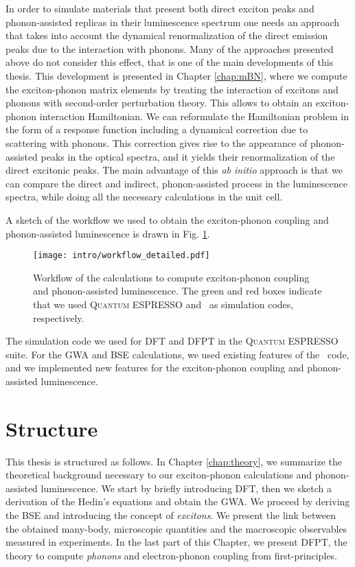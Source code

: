 In order to simulate materials that present both direct exciton
peaks and phonon-assisted replicas in their luminescence spectrum one needs an approach that takes into account the dynamical renormalization of the direct emission peaks due
to the interaction with phonons. Many of the approaches presented above do not consider this effect, that is one of the main developments of this thesis.
This development is presented in Chapter \ref{chap:mBN}, where we compute the exciton-phonon matrix elements by treating the interaction of excitons and phonons with second-order perturbation theory. This allows to obtain an exciton-phonon interaction Hamiltonian. We can reformulate the Hamiltonian problem in the form of a response function including a dynamical correction due to scattering with phonons. This correction gives rise to the appearance of phonon-assisted peaks in the optical spectra, and it yields their renormalization of the direct excitonic peaks. The main advantage of this \textit{ab initio} approach is that we can compare the direct and indirect, phonon-assisted process in the luminescence spectra, while doing all the necessary calculations in the unit cell.

A sketch of the workflow we used to obtain the exciton-phonon coupling and phonon-assisted luminescence is drawn in Fig. \ref{fig:workflow}.
\begin{figure}[H]
	\vspace{0.2cm}
	\setcapindent{2em}
	\centering
	\texttt{[image: intro/workflow\_detailed.pdf]}
	\caption{Workflow of the calculations to compute exciton-phonon coupling and phonon-assisted luminescence. The green and red boxes indicate that we used \textsc{Quantum ESPRESSO} and \yambo~as simulation codes, respectively.}
	\label{fig:workflow}
\end{figure}
The simulation code we used for \acrshort{DFT} and \acrshort{DFPT} in the \textsc{Quantum ESPRESSO} suite.\cite{giannozzi2009quantum,giannozzi2017advanced} For the \acrshort{GWA} and \acrshort{BSE} calculations, we used existing features of the \yambo~code,\cite{Sangalli_2019} and we implemented new features for the exciton-phonon coupling and phonon-assisted luminescence.

\section*{Structure}
This thesis is structured as follows. In Chapter \ref{chap:theory}, we summarize the theoretical background necessary to our exciton-phonon calculations and phonon-assisted luminescence. We start by briefly introducing \acrshort{DFT}, then we sketch a derivation of the Hedin's equations and obtain the \acrfull{GWA}. We proceed by deriving the \acrfull{BSE} and introducing the concept of \textit{excitons}. We present the link between the obtained many-body, microscopic quantities and the macroscopic observables measured in experiments. In the last part of this Chapter, we present \acrshort{DFPT}, the theory to compute \textit{phonons} and electron-phonon coupling from first-principles.

